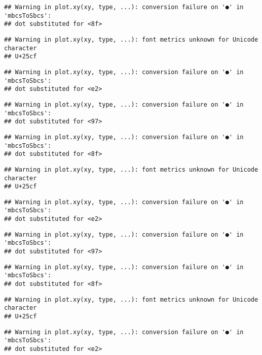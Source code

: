 \documentclass[
]{article}
\begin{document}
\begin{verbatim}
## Warning in plot.xy(xy, type, ...): conversion failure on '●' in 'mbcsToSbcs':
## dot substituted for <8f>
\end{verbatim}

\begin{verbatim}
## Warning in plot.xy(xy, type, ...): font metrics unknown for Unicode character
## U+25cf
\end{verbatim}

\begin{verbatim}
## Warning in plot.xy(xy, type, ...): conversion failure on '●' in 'mbcsToSbcs':
## dot substituted for <e2>
\end{verbatim}

\begin{verbatim}
## Warning in plot.xy(xy, type, ...): conversion failure on '●' in 'mbcsToSbcs':
## dot substituted for <97>
\end{verbatim}

\begin{verbatim}
## Warning in plot.xy(xy, type, ...): conversion failure on '●' in 'mbcsToSbcs':
## dot substituted for <8f>
\end{verbatim}

\begin{verbatim}
## Warning in plot.xy(xy, type, ...): font metrics unknown for Unicode character
## U+25cf
\end{verbatim}

\begin{verbatim}
## Warning in plot.xy(xy, type, ...): conversion failure on '●' in 'mbcsToSbcs':
## dot substituted for <e2>
\end{verbatim}

\begin{verbatim}
## Warning in plot.xy(xy, type, ...): conversion failure on '●' in 'mbcsToSbcs':
## dot substituted for <97>
\end{verbatim}

\begin{verbatim}
## Warning in plot.xy(xy, type, ...): conversion failure on '●' in 'mbcsToSbcs':
## dot substituted for <8f>
\end{verbatim}

\begin{verbatim}
## Warning in plot.xy(xy, type, ...): font metrics unknown for Unicode character
## U+25cf
\end{verbatim}

\begin{verbatim}
## Warning in plot.xy(xy, type, ...): conversion failure on '●' in 'mbcsToSbcs':
## dot substituted for <e2>
\end{verbatim}
\end{document}
